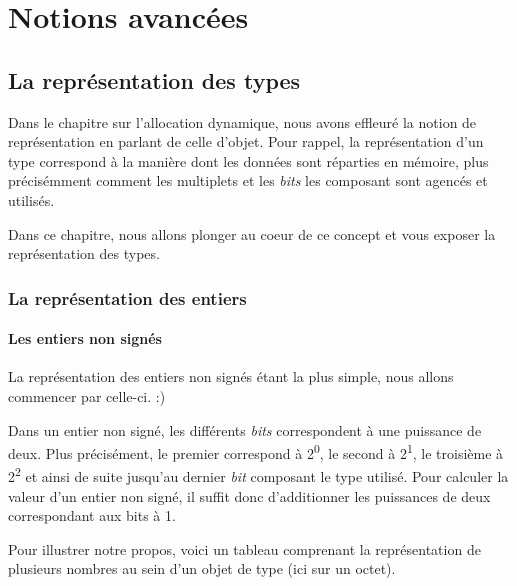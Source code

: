 \part{Notions avancées}
\label{notions-avancees}

\chapter{La représentation des types }
\label{la-representation-des-types }

Dans le chapitre sur l'allocation
  dynamique, nous avons effleuré la notion de représentation en parlant
  de celle d'objet. Pour rappel, la représentation d'un type correspond
  à la manière dont les données sont réparties en mémoire, plus
  précisémment comment les multiplets et les \emph{bits} les composant
  sont agencés et utilisés.
  
  Dans ce chapitre, nous allons plonger au coeur de ce concept et vous
exposer la représentation des types.
  
\section{La représentation des entiers}
\label{la-representation-des-entiers}

\subsection{Les entiers non signés}
\label{les-entiers-non-signes}

La représentation des entiers non signés étant la plus simple, nous
allons commencer par celle-ci. :)

Dans un entier non signé, les différents \emph{bits} correspondent à une
puissance de deux. Plus précisément, le premier correspond à
2\textsuperscript{0}, le second à 2\textsuperscript{1}, le troisième à
2\textsuperscript{2} et ainsi de suite jusqu'au dernier \emph{bit}
composant le type utilisé. Pour calculer la valeur d'un entier non
signé, il suffit donc d'additionner les puissances de deux correspondant
aux bits à 1.

Pour illustrer notre propos, voici un tableau comprenant la
représentation de plusieurs nombres au sein d'un objet de type
 (ici sur un octet).

